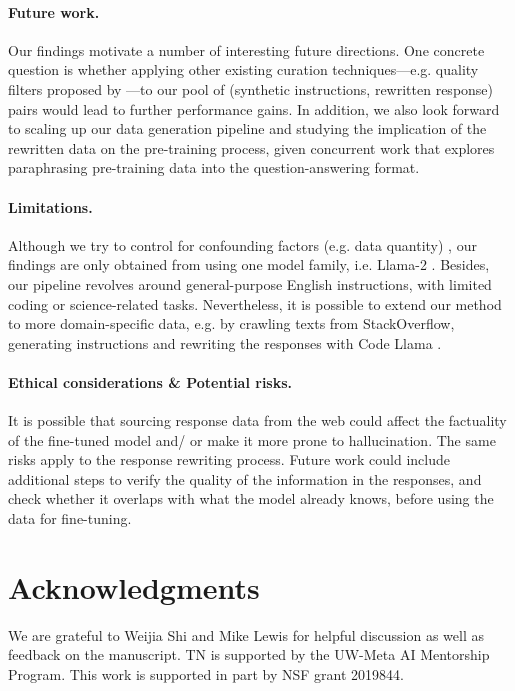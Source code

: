 \paragraph{Future work.} Our findings motivate a number of interesting future directions. One concrete question is whether applying other existing curation techniques---e.g. quality filters proposed by \citet{liu2023makes}---to our pool of (synthetic instructions, rewritten response) pairs would lead to further performance gains. In addition, we also look forward to scaling up our data generation pipeline and studying the implication of the rewritten data on the pre-training process, given concurrent work \cite{maini2024rephrasing} that explores paraphrasing pre-training data into the question-answering format.
\vspace{-0.25em}
\paragraph{Limitations.} Although we try to control for confounding factors (e.g. data quantity)%
, our findings are only obtained from using one model family, i.e. Llama-2 \cite{touvron2023llama2}. Besides, our %
pipeline revolves around general-purpose English instructions, with limited coding or science-related tasks. Nevertheless, it is possible to extend our method to more domain-specific data, e.g. by crawling texts from StackOverflow, generating instructions and rewriting the responses with Code Llama \cite{roziere2023code}. 
\vspace{-0.25em}
\paragraph{Ethical considerations \& Potential risks.} It is possible that sourcing response data from the web could affect the factuality of the fine-tuned model and/ or make it more prone to hallucination. The same risks apply to the response rewriting process. Future work could include additional steps to verify the quality of the information in the responses, and check whether it overlaps with what the model already knows, before using the data for fine-tuning.

\section*{Acknowledgments}
We are grateful to Weijia Shi and Mike Lewis for helpful discussion as well as feedback on the
manuscript. TN is supported by the UW-Meta AI Mentorship Program.
This work is supported in part by NSF grant 2019844.

\newpage

